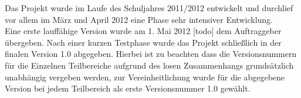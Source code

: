 Das Projekt wurde im Laufe des Schuljahres 2011/2012 entwickelt und durchlief vor allem im März und April 2012 eine Phase sehr intensiver Entwicklung.\\
Eine erste lauffähige Version wurde am 1. Mai 2012 [todo] dem Auftraggeber übergeben. Nach einer kurzen Testphase wurde das Projekt schließlich in der finalen Version 1.0 abgegeben. Hierbei ist zu beachten dass die Versionsnummern für die Einzelnen Teilbereiche aufgrund des losen Zusammenhangs grundsätzlich unabhängig vergeben werden, zur Vereinheitlichung wurde für die abgegebene Version bei jedem Teilbereich als erste Versionsnummer 1.0 gewählt. 
